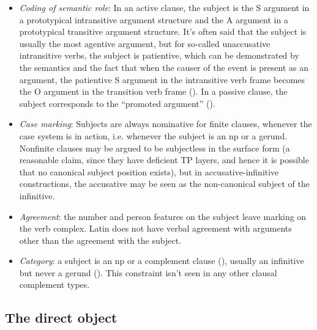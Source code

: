 \documentclass[a4paper, oneside]{report}
\begin{document}
\begin{itemize}
    \item \emph{Coding of semantic role}: In an active clause, 
    the subject 
    is the S argument in a prototypical intransitive argument structure 
    and the A argument in a prototypical transitive argument structure.
    It's often said that the subject is usually the most agentive argument,
    but for so-called unaccusative intransitive verbs, 
    the subject is patientive,
    which can be demonstrated by the semantics 
    and the fact that when the causer of the event is present as an argument, 
    the patientive S argument in the intransitive verb frame
    becomes the O argument in the transition verb frame 
    ().
    In a passive clause, 
    the subject corresponds to the ``promoted argument'' ().  
    \item \emph{Case marking}: 
    Subjects are always nominative for finite clauses,
    whenever the case system is in action,
    i.e. whenever the subject is an \ac{np} or a gerund. 
    Nonfinite clauses may be argued to be subjectless in the surface form 
    (a reasonable claim, since they have deficient TP layers, 
    and hence it is possible that no canonical subject position exists),
    but in accusative-infinitive constructions, %
    the accusative may be seen as the non-canonical subject of the infinitive.
    \item \emph{Agreement}: 
    the number and person features on the subject leave marking on the verb complex.
    Latin does not have verbal agreement with arguments other than the agreement with the subject.
    \item \emph{Category}: a subject is an \ac{np}  
    or a complement clause (), 
    usually an infinitive but never a gerund ().
    This constraint isn't seen in any other clausal complement types.
\end{itemize}


\subsection{The direct object}\label{sec:vp.complement.direct-object}
\end{document}
